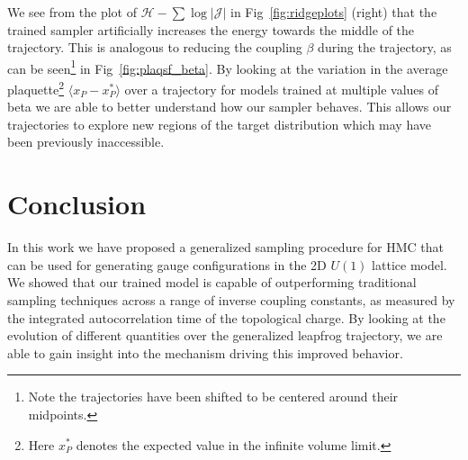 \documentclass[a4paper,11pt]{article}
\begin{document}
We see from the plot of \(\mathcal{H} - \sum \log | \mathcal{J} |\) in
Fig~\ref{fig:ridgeplots} (right) that the trained sampler artificially
increases the energy towards the middle of the trajectory.
%
This is analogous to reducing the coupling \(\beta\) during the trajectory, as
can be seen\footnote{%
    Note the trajectories have been shifted to be centered around their
    midpoints.
} in Fig~\ref{fig:plaqsf_beta}.
%
By looking at the variation in the average plaquette\footnote{%
    Here \(x^{\ast}_{P}\) denotes the expected value in the infinite volume limit.
} \(\langle x_{P} - x^{\ast}_{P}\rangle\) over a trajectory for models trained
at multiple values of beta we are able to better understand how our sampler
behaves.
%
This allows our trajectories to explore new regions of the target distribution
which may have been previously inaccessible.
%
\section{\label{sec:conclusion}Conclusion}
%
In this work we have proposed a generalized sampling procedure for HMC that can
be used for generating gauge configurations in the 2D \(U(1)\) lattice model.
%
We showed that our trained model is capable of outperforming traditional
sampling techniques across a range of inverse coupling constants, as measured
by the integrated autocorrelation time of the topological charge.
%
By looking at the evolution of different quantities over the generalized
leapfrog trajectory, we are able to gain insight into the mechanism driving
this improved behavior.
%





\end{document}
